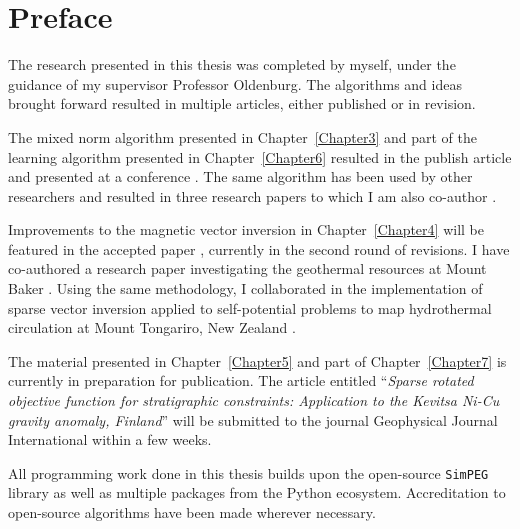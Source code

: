 
\chapter{Preface}
The research presented in this thesis was completed by myself, under the guidance of my supervisor Professor Oldenburg.
The algorithms and ideas brought forward resulted in multiple articles, either published or in revision. 
  
The mixed norm algorithm presented in Chapter~\ref{Chapter3} and part of the learning algorithm presented in Chapter~\ref{Chapter6} resulted in the publish article \cite{FournierDWO2019} and presented at a conference \cite[]{FournierDavis2016a}.
The same algorithm has been used by other researchers and resulted in three research papers to which I am also co-author \cite[]{Miller2017, Abedi2018, Abedi2018a}.

Improvements to the magnetic vector inversion in Chapter~\ref{Chapter4} will be featured in the accepted paper \cite{Fournier2019b}, currently in the second round of revisions. I have co-authored a research paper investigating the geothermal resources at Mount Baker \cite[]{Schermerhorn2017}.
Using the same methodology, I collaborated in the implementation of sparse vector inversion applied to self-potential problems to map hydrothermal circulation at Mount Tongariro, New Zealand \cite[]{Miller2018}. 

The material presented in Chapter~\ref{Chapter5} and part of Chapter~\ref{Chapter7} is currently in preparation for publication. The article entitled ``\emph{Sparse rotated objective function for stratigraphic constraints: Application to the Kevitsa Ni-Cu gravity anomaly, Finland}'' will be submitted to the journal Geophysical Journal International within a few weeks.

All programming work done in this thesis builds upon the open-source \texttt{SimPEG} library as well as multiple packages from the Python ecosystem. Accreditation to open-source algorithms have been made wherever necessary.